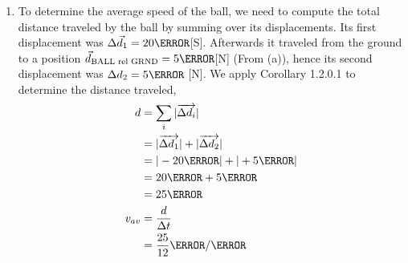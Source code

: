 \documentclass[12pt]{article} %
\newcommand{\tx}[1]{\text{#1}}
\begin{document}
\begin{qstn}[5]
\begin{soln}
\begin{enumerate}[label = (\alph*)]
        \item To determine the average speed of the ball, we need to compute the total distance traveled by the ball by summing over its displacements. Its first displacement was $\Delta \vec d_1 = 20\m$[S]. Afterwards it traveled from the ground to a position $\vec d_{\tx{BALL rel GRND}} = 5\m$[N] (From (a)), hence its second displacement was $\Delta d_2 = 5\m$ [N]. We apply Corollary 1.2.0.1 to determine the distance traveled,
        \begin{align*}
            d &= \sum_i |\overrightarrow{\Delta d_i}|\\
            &= |\overrightarrow{\Delta d_1}| + |\overrightarrow{\Delta d_2}|\\
            &= |-20\m| + |+5\m|\\
            &= 20\m + 5\m\\
            &= 25\m\\
            v_{av} &= \frac{d}{\Delta t}\\
            &= \frac{25}{12} \m / \s
        \end{align*}
    \end{enumerate}



\end{soln}

\end{qstn}
\end{document}
